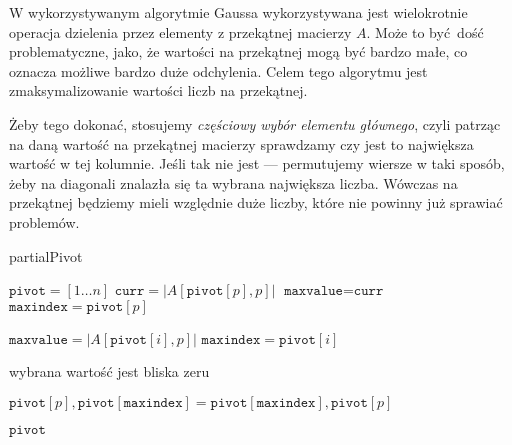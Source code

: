 \documentclass[10pt]{article}
\begin{document}
W wykorzystywanym algorytmie Gaussa wykorzystywana jest wielokrotnie operacja dzielenia przez elementy z przekątnej macierzy $A$. Może to być dość problematyczne, jako, że wartości na przekątnej mogą być bardzo małe, co oznacza możliwe bardzo duże odchylenia. Celem tego algorytmu jest zmaksymalizowanie wartości liczb na przekątnej.

Żeby tego dokonać, stosujemy \textit{częściowy wybór elementu głównego}, czyli patrząc na daną wartość na przekątnej macierzy sprawdzamy czy jest to największa wartość w tej kolumnie. Jeśli tak nie jest — permutujemy wiersze w taki sposób, żeby na diagonali znalazła się ta wybrana największa liczba. Wówczas na przekątnej będziemy mieli względnie duże liczby, które nie powinny już sprawiać problemów.

\begin{algorithm}[H]
    \caption{partialPivot}
    \begin{algorithmic}[1]
        \State $\texttt{pivot} = [1 \dots n]$
        \label{pivot.alg.for-k}
            \label{pivot.alg.for-p}
                \State $\texttt{curr} = \left| A\left[\texttt{pivot}[p], p\right] \right|$
                \State $\texttt{maxvalue} = \texttt{curr}$
                \State $\texttt{maxindex} = \texttt{pivot}[p]$

                \label{pivot.alg.for-max}

                        \State $\texttt{maxvalue} = \left| A\left[ \texttt{pivot}[i], p \right] \right|$
                        \State $\texttt{maxindex} = \texttt{pivot}[i]$
                    \EndIf

                \EndFor

                    \State \Return wybrana wartość jest bliska zeru \label{pivot.alg.error}
                \EndIf

                    \State $\texttt{pivot}[p], \texttt{pivot}[\texttt{maxindex}] = \texttt{pivot}[\texttt{maxindex}], \texttt{pivot}[p]$
                \EndIf

            \EndFor
        \EndFor
        \State \Return $\texttt{pivot}$
    \end{algorithmic}
\end{algorithm}
\end{document}
